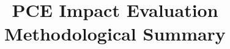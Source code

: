 \documentclass[twocolumn]{bmcart}%
\begin{document}
\begin{frontmatter}

\begin{fmbox}


\title{PCE Impact Evaluation Methodological Summary}


\author[
   addressref={aff1},                   %
   corref={aff1},                       %
   email={davidp6@uw.edu}   %
]{  }


\address[id=aff1]{%
  , %
  ,                     %
  ,                              %
}



\end{fmbox}
\end{frontmatter}
\end{document}
